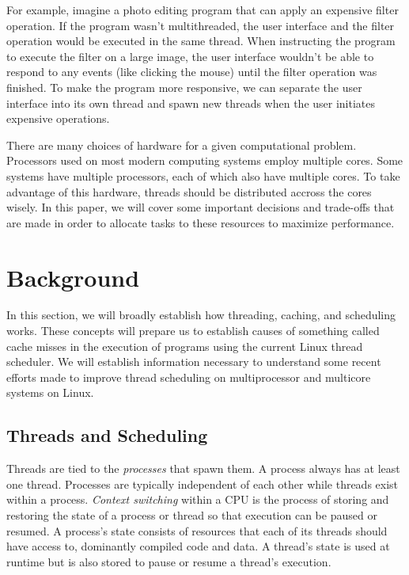 \documentclass{sig-alternate}
\begin{document}
For example, imagine a photo editing program that can apply an expensive filter operation. If the program wasn't multithreaded, the user interface and the filter operation would be executed in the same thread. When instructing the program to execute the filter on a large image, the user interface wouldn't be able to respond to any events (like clicking the mouse) until the filter operation was finished. To make the program more responsive, we can separate the user interface into its own thread and spawn new threads when the user initiates expensive operations.

There are many choices of hardware for a given computational problem. Processors used on most modern computing systems employ multiple cores. Some systems have multiple processors, each of which also have multiple cores. To take advantage of this hardware, threads should be distributed accross the cores wisely. In this paper, we will cover some important decisions and trade-offs that are made in order to allocate tasks to these resources to maximize performance.

\section{Background}
\label{sec:bg}

In this section, we will broadly establish how threading, caching, and scheduling works. These concepts will prepare us to establish causes of something called cache misses in the execution of programs using the current Linux thread scheduler. We will establish information necessary to understand some recent efforts made to improve thread scheduling on multiprocessor and multicore systems on Linux.

\subsection{Threads and Scheduling}
\label{sec:threads}

Threads are tied to the \emph{processes} that spawn them. A process always has at least one thread. Processes are typically independent of each other while threads exist within a process. \emph{Context switching} within a CPU is the process of storing and restoring the state of a process or thread so that execution can be paused or resumed. A process's state consists of resources that each of its threads should have access to, dominantly compiled code and data. A thread's state is used at runtime but is also stored to pause or resume a thread's execution.
\end{document}
